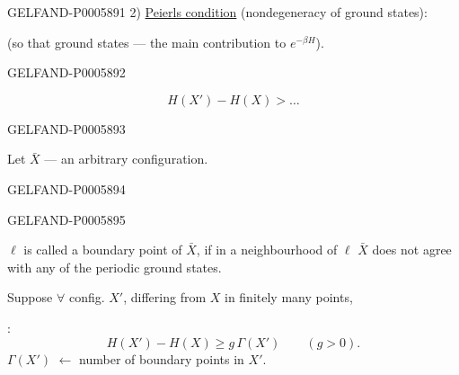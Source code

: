 \begin{GelfandAdjacentEvidence}{GELFAND-P000589}{1}
2) \underline{Peierls condition} (nondegeneracy of ground states):

(so that ground states — the main contribution to \(e^{-\beta H}\)).
\end{GelfandAdjacentEvidence}
\begin{GelfandAdjacentEvidence}{GELFAND-P000589}{2}

\[
H(X')-H(X)>\ldots
\]
\end{GelfandAdjacentEvidence}
\begin{GelfandAdjacentEvidence}{GELFAND-P000589}{3}

Let \(\bar X\) — an arbitrary configuration.
\end{GelfandAdjacentEvidence}
\begin{GelfandAdjacentEvidence}{GELFAND-P000589}{4}

\end{GelfandAdjacentEvidence}
\begin{GelfandAdjacentEvidence}{GELFAND-P000589}{5}

\(\ell\) is called a boundary point of \(\bar X\), if in a neighbourhood of \(\ell\)
\(\bar X\) does not agree with any of the periodic ground states.

Suppose \(\forall\) config. \(X'\), differing from \(X\) in finitely many points,

:
\[
H(X')-H(X)\ge g\,\Gamma(X')\qquad(g>0).
\]
\(\Gamma(X')\) \(\longleftarrow\) number of boundary points in \(X'\).
\end{GelfandAdjacentEvidence}
